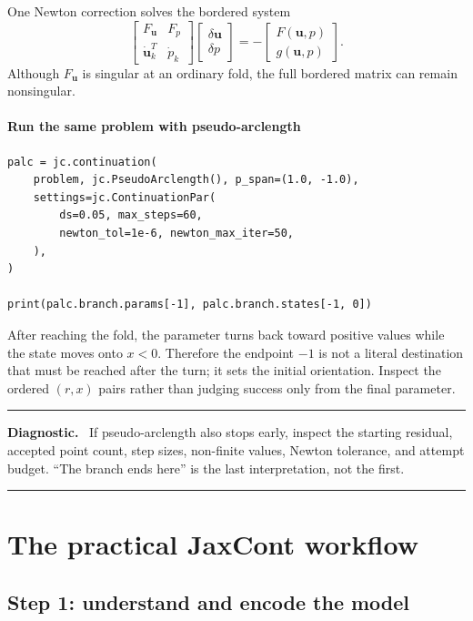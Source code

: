\documentclass[11pt,oneside]{book}
\newcommand{\state}{\bm{u}}
\newcommand{\residual}{F}
\newenvironment{diagnosticbox}
  {\par\medskip\noindent\begin{minipage}{\textwidth}
   \color{JaxOrange!90!black}\rule{\textwidth}{0.8pt}\par
   \textbf{Diagnostic.}\ \color{black}}
  {\par\color{JaxOrange!90!black}\rule{\textwidth}{0.8pt}
   \end{minipage}\par\medskip}
\begin{document}
One Newton correction solves the bordered system
\[
\begin{bmatrix}
\residual_{\state} & \residual_p\\
\dot{\state}_k^T & \dot p_k
\end{bmatrix}
\begin{bmatrix}\delta\state\\\delta p\end{bmatrix}
=-
\begin{bmatrix}\residual(\state,p)\\g(\state,p)\end{bmatrix}.
\]
Although $\residual_{\state}$ is singular at an ordinary fold, the full
bordered matrix can remain nonsingular.

\subsection{Run the same problem with pseudo-arclength}

\begin{lstlisting}
palc = jc.continuation(
    problem, jc.PseudoArclength(), p_span=(1.0, -1.0),
    settings=jc.ContinuationPar(
        ds=0.05, max_steps=60,
        newton_tol=1e-6, newton_max_iter=50,
    ),
)

print(palc.branch.params[-1], palc.branch.states[-1, 0])
\end{lstlisting}

After reaching the fold, the parameter turns back toward positive values while
the state moves onto $x<0$. Therefore the endpoint $-1$ is not a literal
destination that must be reached after the turn; it sets the initial
orientation. Inspect the ordered $(r,x)$ pairs rather than judging success only
from the final parameter.

\begin{diagnosticbox}
If pseudo-arclength also stops early, inspect the starting residual, accepted
point count, step sizes, non-finite values, Newton tolerance, and attempt
budget. ``The branch ends here'' is the last interpretation, not the first.
\end{diagnosticbox}

\part{The practical JaxCont workflow}

\chapter{Step 1: understand and encode the model}
\end{document}
